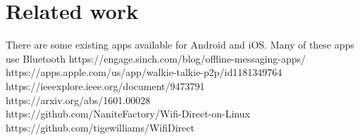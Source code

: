 \documentclass[10pt]{article}
\begin{document}
\section{Related work}
    There are some existing apps available for Android and iOS. Many of these apps use Bluetooth
    https://engage.sinch.com/blog/offline-messaging-apps/ \\
    https://apps.apple.com/us/app/walkie-talkie-p2p/id1181349764 \\
    https://ieeexplore.ieee.org/document/9473791 \\
    https://arxiv.org/abs/1601.00028 \\
    https://github.com/NaniteFactory/Wifi-Direct-on-Linux \\
    https://github.com/tigewilliams/WifiDirect
  
\end{document}
